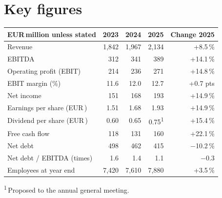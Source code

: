 \documentclass[10.5pt,a4paper]{article}
\newcommand{\eur}{EUR\,}
\begin{document}
\section{Key figures}
\sffamily\small
\begin{tabularx}{\linewidth}{@{}>{\raggedright\arraybackslash}X r r r r@{}}
  \toprule
  \textbf{\eur million unless stated} & \textbf{2023} & \textbf{2024} & \textbf{2025} & \textbf{Change 2025} \\
  \midrule
  Revenue & 1,842 & 1,967 & 2,134 & +8.5\,\% \\
  EBITDA & 312 & 341 & 389 & +14.1\,\% \\
  Operating profit (EBIT) & 214 & 236 & 271 & +14.8\,\% \\
  EBIT margin (\%) & 11.6 & 12.0 & 12.7 & +0.7 pts \\
  Net income & 151 & 168 & 193 & +14.9\,\% \\
  Earnings per share (\eur) & 1.51 & 1.68 & 1.93 & +14.9\,\% \\
  Dividend per share (\eur) & 0.60 & 0.65 & 0.75\textsuperscript{1} & +15.4\,\% \\
  Free cash flow & 118 & 131 & 160 & +22.1\,\% \\
  Net debt & 498 & 462 & 415 & $-$10.2\,\% \\
  Net debt / EBITDA (times) & 1.6 & 1.4 & 1.1 & $-$0.3 \\
  Employees at year end & 7,420 & 7,610 & 7,880 & +3.5\,\% \\
  \bottomrule
\end{tabularx}
{\footnotesize\textsuperscript{1}\,Proposed to the annual general meeting.}
\rmfamily\normalsize
\end{document}
